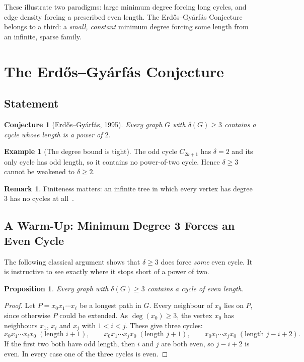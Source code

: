 \documentclass[11pt,a4paper]{article}
\newtheorem{proposition}[theorem]{Proposition}
\newtheorem{conjecture}[theorem]{Conjecture}
\theoremstyle{definition}
\newtheorem{example}[theorem]{Example}
\newtheorem{remark}[theorem]{Remark}
\newcommand{\C}[1]{C_{#1}}
\begin{document}
These illustrate two paradigms: large minimum degree forcing long cycles, and
edge density forcing a prescribed even length. The Erd\H{o}s--Gy\'arf\'as
Conjecture belongs to a third: a \emph{small, constant} minimum degree forcing
some length from an infinite, sparse family.

\section{The Erd\H{o}s--Gy\'arf\'as Conjecture}

\subsection{Statement}

\begin{conjecture}[Erd\H{o}s--Gy\'arf\'as, 1995]\label{conj:eg}
Every graph $G$ with $\delta(G)\ge3$ contains a cycle whose length is a power
of $2$.
\end{conjecture}

\begin{example}[The degree bound is tight]
The odd cycle $\C{2k+1}$ has $\delta=2$ and its only cycle has odd length, so
it contains no power-of-two cycle. Hence $\delta\ge3$ cannot be weakened to
$\delta\ge2$.
\end{example}

\begin{remark}
Finiteness matters: an infinite tree in which every vertex has degree $3$ has
no cycles at all~\cite{erdosproblems}.
\end{remark}

\subsection{A Warm-Up: Minimum Degree 3 Forces an Even Cycle}

The following classical argument shows that $\delta\ge3$ does force
\emph{some} even cycle. It is instructive to see exactly where it stops short
of a power of two.

\begin{proposition}\label{prop:even}
Every graph with $\delta(G)\ge3$ contains a cycle of even length.
\end{proposition}

\begin{proof}
Let $P=x_0x_1\cdots x_\ell$ be a longest path in $G$. Every neighbour of
$x_0$ lies on $P$, since otherwise $P$ could be extended. As
$\deg(x_0)\ge3$, the vertex $x_0$ has neighbours $x_1$, $x_i$ and $x_j$ with
$1<i<j$. These give three cycles:
\[
  x_0x_1\cdots x_ix_0 \;(\text{length } i+1),\qquad
  x_0x_1\cdots x_jx_0 \;(\text{length } j+1),\qquad
  x_0x_i\cdots x_jx_0 \;(\text{length } j-i+2).
\]
If the first two both have odd length, then $i$ and $j$ are both even, so
$j-i+2$ is even. In every case one of the three cycles is even.
\end{proof}
\end{document}
